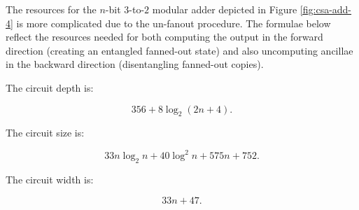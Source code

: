The resources for the $n$-bit $3$-to-$2$ modular adder depicted in Figure
\ref{fig:csa-add-4} is more complicated due to the un-fanout procedure.
The formulae below reflect the resources needed for both computing the output
in the forward direction (creating an entangled fanned-out state)
and also uncomputing ancillae in the backward
direction (disentangling fanned-out copies).

The circuit depth is:

\begin{equation}
356 + 8\log_2(2n+4)\text{.}
\end{equation}

The circuit size is:

\begin{equation}
33n\log_2 n + 40\log^2 n + 575n + 752\text{.}
\end{equation}

The circuit width is:

\begin{equation}
33n + 47\text{.}
\end{equation}
